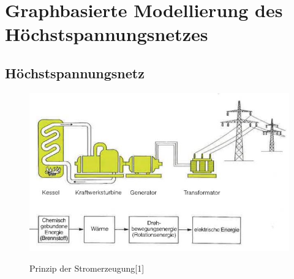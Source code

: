 
\chapter{Graphbasierte Modellierung des Höchstspannungsnetzes}
\label{Kapitel 2}
%

\section{Höchstspannungsnetz}
\label{Höchstspannungsnetz}
%
\begin{figure}[t]
	\centering
	{\includegraphics[scale=0.9]{bilder/pds}\label{fig_pds}
	}\\
	\caption[Prinzip der Stromerzeugung]{Prinzip der Stromerzeugung[1]}
	\label{fig_pds}
\end{figure}

